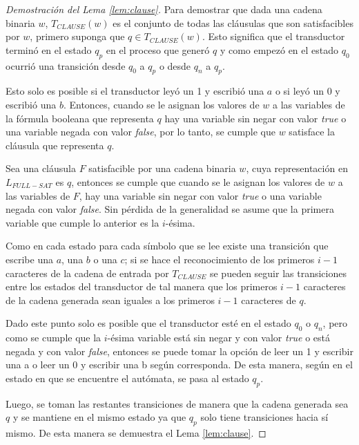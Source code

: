 \documentclass[12pt]{article}
\newcommand{\true}{\textit{true}}
\newcommand{\false}{\textit{false}}
\begin{document}
\begin{proof}[Demostración del Lema \ref{lem:clause}]
    Para demostrar que dada una cadena binaria $w$, $T_{CLAUSE}(w)$ es el conjunto de todas las cláusulas que son satisfacibles por $w$, primero suponga que $q\in T_{CLAUSE}(w)$.  Esto significa que el transductor terminó en el estado $q_p$ en el proceso que generó $q$ y como empezó en el estado $q_0$ ocurrió una transición desde $q_0$ a $q_p$ o desde $q_n$ a $q_p$. 
    
    Esto solo es posible si el transductor leyó un 1 y escribió una $a$ o si leyó un 0 y escribió una $b$. Entonces, cuando se le asignan los valores de $w$ a las variables de la fórmula booleana que representa $q$ hay una variable sin negar con valor \true{} o una variable negada con valor \false{}, por lo tanto, se cumple que $w$ satisface la cláusula que representa $q$.
    
    Sea una cláusula $F$ satisfacible por una cadena binaria $w$, cuya representación en $L_{FULL-SAT}$ es $q$, entonces se cumple que 
    cuando se le asignan los valores de $w$ a las variables de $F$, hay una variable sin negar con valor \true{} o una variable negada con valor \false{}. Sin pérdida de la generalidad se asume que la primera variable que cumple 
    lo anterior es la $i$-ésima.  
    
    Como en cada estado para cada símbolo que se lee existe una transición que escribe una $a$, una $b$ o una $c$;
    si se hace el reconocimiento de los primeros $i-1$ caracteres de la cadena de entrada por $T_{CLAUSE}$
    se pueden seguir las transiciones entre los estados del transductor de tal manera que los primeros $i-1$
    caracteres de la cadena generada sean iguales a los primeros $i-1$ caracteres de $q$. 

    Dado este punto solo es posible que el transductor esté en el estado $q_0$ o $q_n$, pero como se cumple que la $i$-ésima variable está sin negar y con valor \true{} o está negada y con valor \false{}, entonces se puede tomar la opción de leer un 1 y escribir una a o leer un 0 y escribir una b según corresponda.  De esta manera, según en el estado en que se encuentre el autómata, se pasa al estado $q_p$.
    
    Luego, se toman las restantes transiciones de manera que la cadena generada sea $q$ y se mantiene en el mismo estado ya que $q_p$ solo tiene transiciones hacia sí mismo. De esta manera se demuestra el Lema \ref{lem:clause}. 
    
\end{proof}
\end{document}
